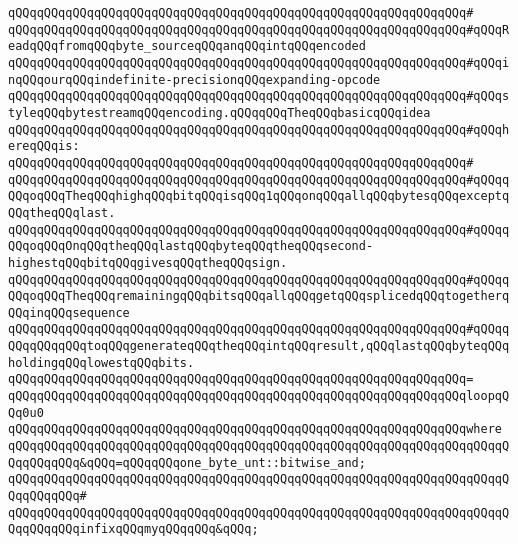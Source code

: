 \verb|qQQqqQQqqQQqqQQqqQQqqQQqqQQqqQQqqQQqqQQqqQQqqQQqqQQqqQQqqQQqqQQq#|\newline
\verb|qQQqqQQqqQQqqQQqqQQqqQQqqQQqqQQqqQQqqQQqqQQqqQQqqQQqqQQqqQQqqQQq#qQQqReadqQQqfromqQQqbyte_sourceqQQqanqQQqintqQQqencoded|\newline
\verb|qQQqqQQqqQQqqQQqqQQqqQQqqQQqqQQqqQQqqQQqqQQqqQQqqQQqqQQqqQQqqQQq#qQQqinqQQqourqQQqindefinite-precisionqQQqexpanding-opcode|\newline
\verb|qQQqqQQqqQQqqQQqqQQqqQQqqQQqqQQqqQQqqQQqqQQqqQQqqQQqqQQqqQQqqQQq#qQQqstyleqQQqbytestreamqQQqencoding.qQQqqQQqTheqQQqbasicqQQqidea|\newline
\verb|qQQqqQQqqQQqqQQqqQQqqQQqqQQqqQQqqQQqqQQqqQQqqQQqqQQqqQQqqQQqqQQq#qQQqhereqQQqis:|\newline
\verb|qQQqqQQqqQQqqQQqqQQqqQQqqQQqqQQqqQQqqQQqqQQqqQQqqQQqqQQqqQQqqQQq#|\newline
\verb|qQQqqQQqqQQqqQQqqQQqqQQqqQQqqQQqqQQqqQQqqQQqqQQqqQQqqQQqqQQqqQQq#qQQqqQQqoqQQqTheqQQqhighqQQqbitqQQqisqQQq1qQQqonqQQqallqQQqbytesqQQqexceptqQQqtheqQQqlast.|\newline
\verb|qQQqqQQqqQQqqQQqqQQqqQQqqQQqqQQqqQQqqQQqqQQqqQQqqQQqqQQqqQQqqQQq#qQQqqQQqoqQQqOnqQQqtheqQQqlastqQQqbyteqQQqtheqQQqsecond-highestqQQqbitqQQqgivesqQQqtheqQQqsign.|\newline
\verb|qQQqqQQqqQQqqQQqqQQqqQQqqQQqqQQqqQQqqQQqqQQqqQQqqQQqqQQqqQQqqQQq#qQQqqQQqoqQQqTheqQQqremainingqQQqbitsqQQqallqQQqgetqQQqsplicedqQQqtogetherqQQqinqQQqsequence|\newline
\verb|qQQqqQQqqQQqqQQqqQQqqQQqqQQqqQQqqQQqqQQqqQQqqQQqqQQqqQQqqQQqqQQq#qQQqqQQqqQQqqQQqtoqQQqgenerateqQQqtheqQQqintqQQqresult,qQQqlastqQQqbyteqQQqholdingqQQqlowestqQQqbits.|\newline
\verb|qQQqqQQqqQQqqQQqqQQqqQQqqQQqqQQqqQQqqQQqqQQqqQQqqQQqqQQqqQQqqQQq=|\newline
\verb|qQQqqQQqqQQqqQQqqQQqqQQqqQQqqQQqqQQqqQQqqQQqqQQqqQQqqQQqqQQqqQQqloopqQQq0u0|\newline
\verb|qQQqqQQqqQQqqQQqqQQqqQQqqQQqqQQqqQQqqQQqqQQqqQQqqQQqqQQqqQQqqQQqwhere|\newline
\verb|qQQqqQQqqQQqqQQqqQQqqQQqqQQqqQQqqQQqqQQqqQQqqQQqqQQqqQQqqQQqqQQqqQQqqQQqqQQqqQQq&qQQq=qQQqqQQqone_byte_unt::bitwise_and;|\newline
\verb|qQQqqQQqqQQqqQQqqQQqqQQqqQQqqQQqqQQqqQQqqQQqqQQqqQQqqQQqqQQqqQQqqQQqqQQqqQQqqQQq#|\newline
\verb|qQQqqQQqqQQqqQQqqQQqqQQqqQQqqQQqqQQqqQQqqQQqqQQqqQQqqQQqqQQqqQQqqQQqqQQqqQQqqQQqinfixqQQqmyqQQqqQQq&qQQq;|\newline
